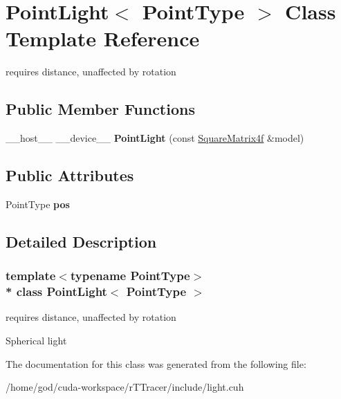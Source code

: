 \hypertarget{class_point_light}{}\section{Point\+Light$<$ Point\+Type $>$ Class Template Reference}
\label{class_point_light}


requires distance, unaffected by rotation  


\subsection*{Public Member Functions}
\begin{DoxyCompactItemize}
\item 
\+\_\+\+\_\+host\+\_\+\+\_\+ \+\_\+\+\_\+device\+\_\+\+\_\+ {\bfseries Point\+Light} (const \hyperlink{class_square_matrix4}{Square\+Matrix4f} \&model)\hypertarget{class_point_light_a01fae78fac3286f01acead5ad0dadf8b}{}\label{class_point_light_a01fae78fac3286f01acead5ad0dadf8b}

\end{DoxyCompactItemize}
\subsection*{Public Attributes}
\begin{DoxyCompactItemize}
\item 
Point\+Type {\bfseries pos}\hypertarget{class_point_light_a5546247e7a8ccc1ff713898703f1db07}{}\label{class_point_light_a5546247e7a8ccc1ff713898703f1db07}

\end{DoxyCompactItemize}


\subsection{Detailed Description}
\subsubsection*{template$<$typename Point\+Type$>$\\*
class Point\+Light$<$ Point\+Type $>$}

requires distance, unaffected by rotation 

Spherical light 

The documentation for this class was generated from the following file\+:\begin{DoxyCompactItemize}
\item 
/home/god/cuda-\/workspace/r\+T\+Tracer/include/light.\+cuh\end{DoxyCompactItemize}

